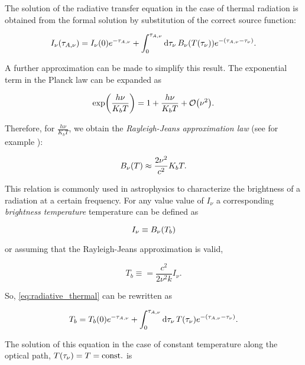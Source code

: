 The solution of the radiative transfer equation in the case of thermal
radiation is obtained from the formal solution by substitution of the
correct source function:

\begin{equation}
        I_\nu\qty(\tau_{A,\nu}) = I_\nu\qty(0) e^{-\tau_{A,\nu}} +
        \int^{\tau_{A,\nu}}_0 \dd{\tau_\nu} B_\nu\qty(T\qty(\tau_\nu))
        e^{-\qty(\tau_{A,\nu} - \tau_\nu)}.
        \label{eq:radiative_thermal}
\end{equation}

A further approximation can be made to simplify this result.
The exponential term in the Planck law can be expanded as

\begin{equation}
       \exp(\frac{h\nu}{K_b T}) = 1 + \frac{h\nu}{K_b T} + \order{\nu^2}.
\end{equation}

Therefore, for $\frac{h \nu}{K_b T}$, we obtain the \emph{Rayleigh-Jeans
approximation law} (see for example \cite{condon2016essential}):

\begin{equation}
        B_\nu\qty(T) \approx \frac{2\nu^2}{c^2} K_b T.
\end{equation}

This relation is commonly used in astrophysics to characterize the
brightness of a radiation at a certain frequency. For any value value of
$I_\nu$ a corresponding \emph{brightness temperature} temperature can be
defined as

\begin{equation}
        I_\nu \equiv B_\nu\qty(T_b)
\end{equation}

or assuming that the Rayleigh-Jeans approximation is valid,

\begin{equation}
        T_b \equiv = \frac{c^2}{2\nu^2k} I_\nu.
\end{equation}

So, \autoref{eq:radiative_thermal} can be rewritten as

\begin{equation}
        T_b = T_b\qty(0) e^{-\tau_{A,\nu}} +
        \int^{\tau_{A,\nu}}_0 \dd{\tau_\nu} T\qty(\tau_\nu)
        e^{-\qty(\tau_{A,\nu} - \tau_\nu)}.
\end{equation}

The solution of this equation in the case of constant temperature along the
optical path, $T\qty(\tau_\nu) = T = \text{const.}$ is

